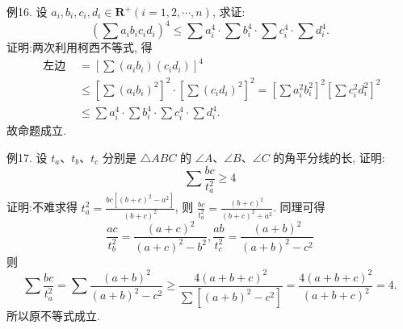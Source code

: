 例16. 设 $a_i, b_i, c_i, d_i \in \mathbf{R}^{+}(i=1,2, \cdots, n)$, 求证:
$$
\left(\sum a_i b_i c_i d_i\right)^4 \leqslant \sum a_i^4 \cdot \sum b_i^4 \cdot \sum c_i^4 \cdot \sum d_i^4 .
$$
证明:两次利用柯西不等式, 得
$$
\begin{aligned}
\text { 左边 } & =\left[\sum\left(a_i b_i\right)\left(c_i d_i\right)\right]^4 \\
& \leqslant\left[\sum\left(a_i b_i\right)^2\right]^2 \cdot\left[\sum\left(c_i d_i\right)^2\right]^2=\left[\sum a_i^2 b_i^2\right]^2\left[\sum c_i^2 d_i^2\right]^2 \\
& \leqslant \sum a_i^4 \cdot \sum b_i^4 \cdot \sum c_i^4 \cdot \sum d_i^4 .
\end{aligned}
$$
故命题成立.



例17. 设 $t_a 、 t_b 、 t_c$ 分别是 $\triangle A B C$ 的 $\angle A 、 \angle B 、 \angle C$ 的角平分线的长, 证明:
$$
\sum \frac{b c}{t_a^2} \geqslant 4
$$
证明:不难求得 $t_a^2=\frac{b c\left[(b+c)^2-a^2\right]}{(b+c)^2}$, 则 $\frac{b c}{t_a^2}=\frac{(b+c)^2}{(b+c)^2 \div a^2}$.
同理可得
$$
\frac{a c}{t_b^2}=\frac{(a+c)^2}{(a+c)^2-b^2}, \frac{a b}{t_c^2}=\frac{(a+b)^2}{(a+b)^2-c^2}
$$
则
$$
\sum \frac{b c}{t_a^2}=\sum \frac{(a+b)^2}{(a+b)^2-c^2} \geqslant \frac{4(a+b+c)^2}{\sum\left[(a+b)^2-c^2\right]}=\frac{4(a+b+c)^2}{(a+b+c)^2}=4 .
$$
所以原不等式成立.



